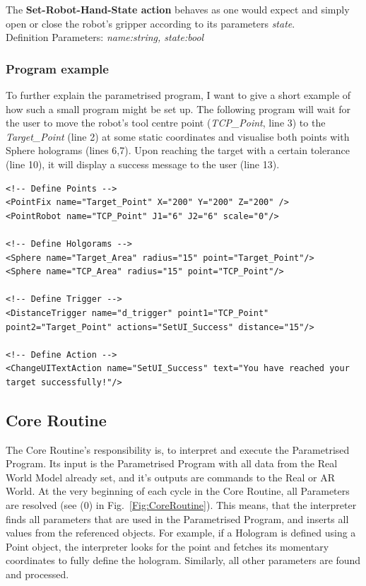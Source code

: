 The \textbf{Set-Robot-Hand-State action} behaves as one would expect and simply open or close the robot's gripper according to its parameters \textit{state}.\\Definition Parameters: \textit{name:string, state:bool}

\subsubsection{Program example}
To further explain the parametrised program, I want to give a short example of how such a small program might be set up. The following program will wait for the user to move the robot's tool centre point (\textit{TCP\_Point}, line 3) to the \textit{Target\_Point} (line 2) at some static coordinates and visualise both points with Sphere holograms (lines 6,7). Upon reaching the target with a certain tolerance (line 10), it will display a success message to the user (line 13).

\begin{lstlisting}
<!-- Define Points -->
<PointFix name="Target_Point" X="200" Y="200" Z="200" />
<PointRobot name="TCP_Point" J1="6" J2="6" scale="0"/>

<!-- Define Holgorams -->
<Sphere name="Target_Area" radius="15" point="Target_Point"/>
<Sphere name="TCP_Area" radius="15" point="TCP_Point"/>

<!-- Define Trigger -->
<DistanceTrigger name="d_trigger" point1="TCP_Point" point2="Target_Point" actions="SetUI_Success" distance="15"/>
	
<!-- Define Action -->
<ChangeUITextAction name="SetUI_Success" text="You have reached your target successfully!"/>
\end{lstlisting}


\subsection{Core Routine}
The Core Routine's responsibility is, to interpret and execute the Parametrised Program. Its input is the Parametrised Program with all data from the Real World Model already set, and it's outputs are commands to the Real or AR World. At the very beginning of each cycle in the Core Routine, all Parameters are resolved (see (0) in Fig.~\ref{Fig:CoreRoutine}). This means, that the interpreter finds all parameters that are used in the Parametrised Program, and inserts all values from the referenced objects. For example, if a Hologram is defined using a Point object, the interpreter looks for the point and fetches its momentary coordinates to fully define the hologram. Similarly, all other parameters are found and processed.

